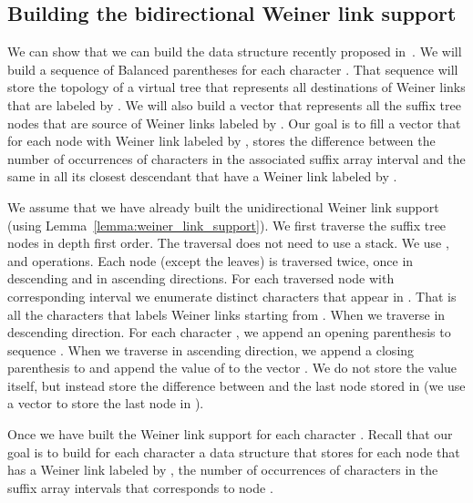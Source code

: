 \documentclass[a4paper]{article}
\begin{document}
\begin{enumerate}
\subsection{Building the bidirectional Weiner link support}
\label{sec:build_biweiner_links}

We can show that we can build the data structure recently proposed in~\cite{BCKM13}. 
We will build a sequence of Balanced parentheses  for each character 
. That sequence will store the topology of a virtual tree that represents 
all destinations of Weiner links that are labeled by . 
We will also build a vector  that represents all the suffix tree 
nodes that are source of Weiner links labeled by . 
Our goal is to fill a vector  that for each node with Weiner 
link labeled by , stores the difference  between the number of 
occurrences of characters  in the associated suffix array interval and the same 
in all its closest descendant that have a Weiner link labeled by . 

We assume that we have already built the unidirectional Weiner link support
(using Lemma~\ref{lemma:weiner_link_support}). 
We first traverse the suffix tree nodes in depth first order. The traversal 
does not need to use a stack. We use ,  
and  operations. Each node (except the leaves) 
is traversed twice, once in descending and in ascending 
directions. 
For each traversed node  with corresponding 
interval  we enumerate distinct characters 
that appear in . That is all the characters 
that labels Weiner links starting from . 
When we traverse  in descending direction. For each character , we append an 
opening parenthesis to sequence . When we traverse  in ascending 
direction, we append a closing parenthesis to  and append the value 
of  to the vector . We do not store the value itself, but instead 
store the difference between  and the last node stored in  (we use 
a vector  to store the last node in ). 

Once we have built the Weiner link support for each character . 
Recall that our goal is to build for each character  a data structure that stores 
for each node  that has a Weiner link labeled by , the number 
of occurrences of characters  in the suffix array intervals that corresponds to node . 


\end{enumerate}
\end{document}
